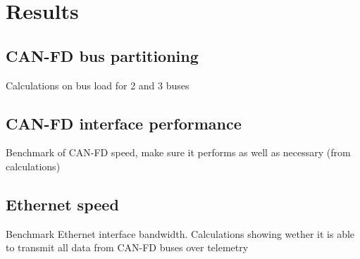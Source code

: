 \section{Results}

\subsection{CAN-FD bus partitioning}

{\color{red} Calculations on bus load for 2 and 3 buses}

\subsection{CAN-FD interface performance}

{\color{red} Benchmark of CAN-FD speed, make sure it performs as well as necessary (from calculations)}

\subsection{Ethernet speed}

{\color{red} Benchmark Ethernet interface bandwidth. Calculations showing wether it is able to transmit all data from CAN-FD buses over telemetry}
